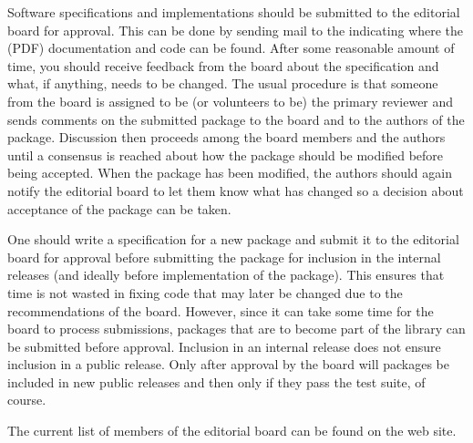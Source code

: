 Software specifications and implementations should be submitted to the
editorial board for approval.  This can be done by sending mail to
the 
 indicating
where the (PDF) documentation and code can be found.  After
some reasonable amount of time, you should receive feedback from
the board about the specification and what, if anything, needs to
be changed. The usual procedure is that someone from the board is
assigned to be (or volunteers to be) the primary reviewer and sends
comments on the submitted package to the board and to the authors of
the package.  Discussion then proceeds among the board members and the
authors until a consensus is reached about how the package should be
modified before being accepted.  When the package has been modified,
the authors should again notify the editorial board to let them
know what has changed so a decision about acceptance of the package
can be taken.

One should write a specification for a new package
and submit it to the editorial board for
approval before submitting the package for inclusion in the internal
releases (and ideally before implementation of the package).  This
ensures that time is not wasted in fixing code that may later be changed
due to the recommendations of the board.
However, since it can take some time for the board to process
submissions, packages that are to become part of the library
can be submitted
 before approval.
Inclusion in an internal release does not ensure inclusion in a public
release.  Only after approval by the board will packages be included in new
public releases and then only if they pass the test suite, of course.

The current list of members of the editorial board can be found on the web site.


